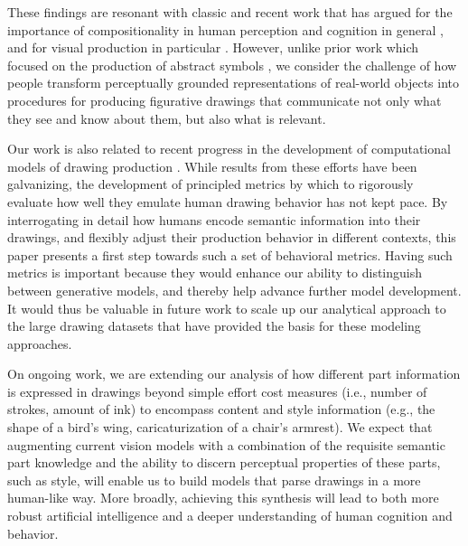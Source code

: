 \documentclass[10pt,letterpaper]{article}
\begin{document}
These findings are resonant with classic and recent work that has argued for the importance of compositionality in human perception and cognition in general \cite{biederman1987recognition, battaglia2018relational,lake2017building}, and for visual production in particular \cite{lake2015human}. 
However, unlike prior work which focused on the production of abstract symbols \cite{lake2015human}, we consider the challenge of how people transform perceptually grounded representations of real-world objects into procedures for producing figurative drawings that communicate not only what they see and know about them, but also what is relevant. 

Our work is also related to recent progress in the development of computational models of drawing production \cite{ha2017neural,li2019photo}. 
While results from these efforts have been galvanizing, the development of principled metrics by which to rigorously evaluate how well they emulate human drawing behavior has not kept pace. 
By interrogating in detail how humans encode semantic information into their drawings, and flexibly adjust their production behavior in different contexts, this paper presents a first step towards such a set of behavioral metrics. 
Having such metrics is important because they would enhance our ability to distinguish between generative models, and thereby help advance further model development. 
It would thus be valuable in future work to scale up our analytical approach to the large drawing datasets \cite{eitz2012humans,sangkloy2016sketchy,quickdraw2017} that have provided the basis for these modeling approaches.

On ongoing work, we are extending our analysis of how different part information is expressed in drawings beyond simple effort cost measures (i.e., number of strokes, amount of ink) to encompass content and style information (e.g., the shape of a bird's wing, caricaturization of a chair's armrest). 
We expect that augmenting current vision models with a combination of the requisite semantic part knowledge and the ability to discern perceptual properties of these parts, such as style, will enable us to build models that parse drawings in a more human-like way.
More broadly, achieving this synthesis will lead to both more robust artificial intelligence and a deeper understanding of human cognition and behavior. 
\end{document}
